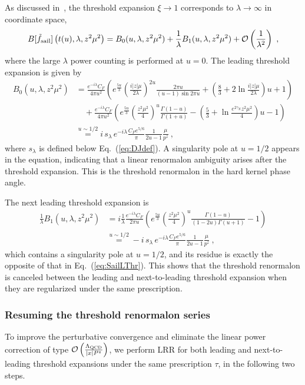 \documentclass[a4paper,11pt]{article}
\begin{document}
As discussed in~\cite{Liu:2023onm}, the threshold expansion $\xi \rightarrow 1$ corresponds to $\lambda \rightarrow \infty$ in coordinate space,
\begin{align}
B[\tilde f_{\rm sail}]\left(t(u),\lambda,z^2\mu^2\right) 
= B_0(u,\lambda,z^2\mu^2)+\frac{1}{\lambda} B_1(u,\lambda,z^2\mu^2)+\mathcal{O}\left(\frac{1}{\lambda^2}\right) \ ,
\end{align}
where the large $\lambda$ power counting is performed at $u=0$. The leading threshold expansion is given by
\begin{align}\label{eq:SailLThr}
B_0(u,\lambda,z^2\mu^2) & = 
\frac{e^{-i \lambda} C_F}{4 \pi u^2}\left(e^{\frac{5 u}{3}}\left(\frac{i|z| \mu}{2 \lambda}\right)^{2 u} \frac{2 \pi u}{(u-1) \sin 2 \pi u}+\left(\frac{8}{3}+2 \ln \frac{i|z| \mu}{2 \lambda}\right) u+1\right) \nonumber\\
& \quad + \frac{e^{-i \lambda} C_F}{4 \pi u^2}\left(e^{\frac{5 u}{3}}\left(\frac{z^2 \mu^2}{4}\right)^u \frac{\Gamma(1-u)}{\Gamma(1+u)}-\left(\frac{5}{3}+\ln \frac{e^{2 \gamma_E} z^2 \mu^2}{4}\right) u-1\right) \nonumber\\
&\stackrel{u \sim 1/2}{=} i \, s_{\lambda} \, e^{-i \lambda} \frac{C_F e^{5/6}}{\pi} \frac{1}{2 u -1} \frac{\mu}{p^z} \ ,
\end{align}
where $s_{\lambda}$ is defined below Eq.~(\ref{eq:DJdef}). A singularity pole at $u=1/2$ appears in the equation, indicating that a linear renormalon ambiguity arises after the threshold expansion. This is the threshold renormalon in the hard kernel phase angle. 

The next leading threshold expansion is
\begin{align}
\frac{1}{\lambda} B_1(u,\lambda,z^2\mu^2) & 
= i \frac{1}{\lambda} \frac{e^{-i \lambda} C_F}{2 \pi u}\left(e^{\frac{5 u}{3}}\left(\frac{z^2 \mu^2}{4}\right)^u \frac{\Gamma(1-u)}{(1-2 u) \Gamma(u+1)}-1\right) \nonumber\\
&\stackrel{u \sim 1/2}{=} - i \, s_{\lambda} \, e^{-i \lambda} \frac{C_F e^{5/6}}{\pi} \frac{1}{2 u -1} \frac{\mu}{p^z} \ ,
\end{align}
which contains a singularity pole at $u=1/2$, and its residue is exactly the opposite of that in Eq.~(\ref{eq:SailLThr}). This shows that the threshold renormalon is canceled between the leading and next-to-leading threshold expansion when they are regularized under the same prescription. 


\subsubsection{Resuming the threshold renormalon series}
To improve the perturbative convergence and eliminate the linear power correction of type $\mathcal{O}\left(\frac{\Lambda_{\rm QCD}}{|x| P^z}\right)$, we perform LRR for both leading and next-to-leading threshold expansions under the same prescription $\tau$, in the following two steps.
\end{document}
